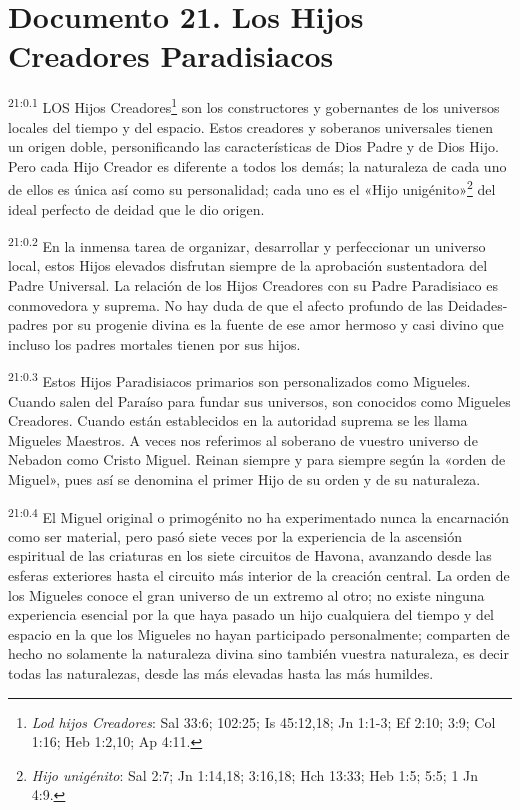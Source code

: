 \chapter{Documento 21. Los Hijos Creadores Paradisiacos}
\par
\textsuperscript{21:0.1} LOS Hijos Creadores\footnote{\textit{Lod hijos Creadores}: Sal 33:6; 102:25; Is 45:12,18; Jn 1:1-3; Ef 2:10; 3:9; Col 1:16; Heb 1:2,10; Ap 4:11.} son los constructores y gobernantes de los universos locales del tiempo y del espacio. Estos creadores y soberanos universales tienen un origen doble, personificando las características de Dios Padre y de Dios Hijo. Pero cada Hijo Creador es diferente a todos los demás; la naturaleza de cada uno de ellos es única así como su personalidad; cada uno es el «Hijo unigénito»\footnote{\textit{Hijo unigénito}: Sal 2:7; Jn 1:14,18; 3:16,18; Hch 13:33; Heb 1:5; 5:5; 1 Jn 4:9.} del ideal perfecto de deidad que le dio origen.

\par
\textsuperscript{21:0.2} En la inmensa tarea de organizar, desarrollar y perfeccionar un universo local, estos Hijos elevados disfrutan siempre de la aprobación sustentadora del Padre Universal. La relación de los Hijos Creadores con su Padre Paradisiaco es conmovedora y suprema. No hay duda de que el afecto profundo de las Deidades-padres por su progenie divina es la fuente de ese amor hermoso y casi divino que incluso los padres mortales tienen por sus hijos.

\par
\textsuperscript{21:0.3} Estos Hijos Paradisiacos primarios son personalizados como Migueles. Cuando salen del Paraíso para fundar sus universos, son conocidos como Migueles Creadores. Cuando están establecidos en la autoridad suprema se les llama Migueles Maestros. A veces nos referimos al soberano de vuestro universo de Nebadon como Cristo Miguel. Reinan siempre y para siempre según la «orden de Miguel», pues así se denomina el primer Hijo de su orden y de su naturaleza.

\par
\textsuperscript{21:0.4} El Miguel original o primogénito no ha experimentado nunca la encarnación como ser material, pero pasó siete veces por la experiencia de la ascensión espiritual de las criaturas en los siete circuitos de Havona, avanzando desde las esferas exteriores hasta el circuito más interior de la creación central. La orden de los Migueles conoce el gran universo de un extremo al otro; no existe ninguna experiencia esencial por la que haya pasado un hijo cualquiera del tiempo y del espacio en la que los Migueles no hayan participado personalmente; comparten de hecho no solamente la naturaleza divina sino también vuestra naturaleza, es decir todas las naturalezas, desde las más elevadas hasta las más humildes.

